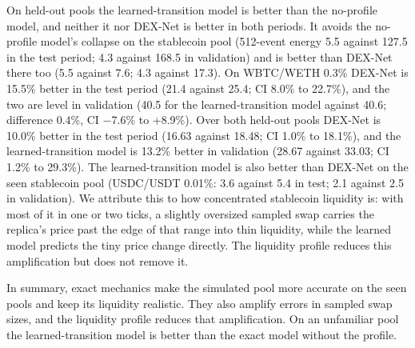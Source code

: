 \documentclass[11pt]{article}
\begin{document}
On held-out pools the learned-transition model is better than the no-profile model, and neither it nor DEX-Net is better in both periods. It avoids the no-profile model's collapse on the stablecoin pool (512-event energy 5.5 against 127.5 in the test period; 4.3 against 168.5 in validation) and is better than DEX-Net there too (5.5 against 7.6; 4.3 against 17.3). On WBTC/WETH 0.3\% DEX-Net is 15.5\% better in the test period (21.4 against 25.4; CI 8.0\% to 22.7\%), and the two are level in validation (40.5 for the learned-transition model against 40.6; difference 0.4\%, CI \ensuremath{-}7.6\% to +8.9\%). Over both held-out pools DEX-Net is 10.0\% better in the test period (16.63 against 18.48; CI 1.0\% to 18.1\%), and the learned-transition model is 13.2\% better in validation (28.67 against 33.03; CI 1.2\% to 29.3\%). The learned-transition model is also better than DEX-Net on the seen stablecoin pool (USDC/USDT 0.01\%: 3.6 against 5.4 in test; 2.1 against 2.5 in validation). We attribute this to how concentrated stablecoin liquidity is: with most of it in one or two ticks, a slightly oversized sampled swap carries the replica's price past the edge of that range into thin liquidity, while the learned model predicts the tiny price change directly. The liquidity profile reduces this amplification but does not remove it.

In summary, exact mechanics make the simulated pool more accurate on the seen pools and keep its liquidity realistic. They also amplify errors in sampled swap sizes, and the liquidity profile reduces that amplification. On an unfamiliar pool the learned-transition model is better than the exact model without the profile.
\end{document}
